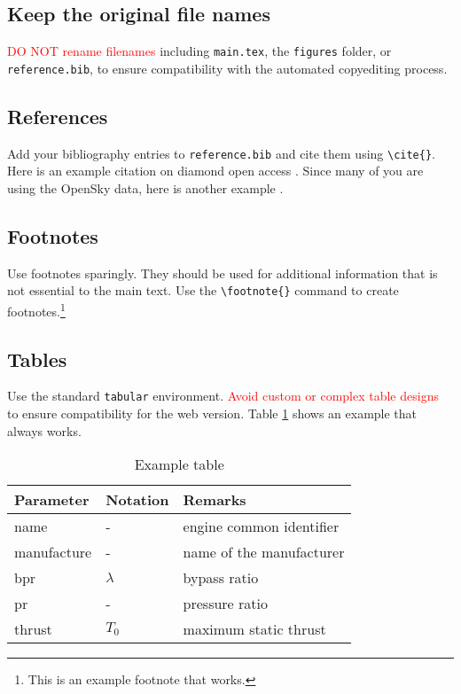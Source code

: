 \subsection{Keep the original file names}
\textcolor{red}{DO NOT rename filenames} including \texttt{main.tex}, the \texttt{figures} folder, or \texttt{reference.bib}, to ensure compatibility with the automated copyediting process.

\subsection{References}
Add your bibliography entries to \texttt{reference.bib} and cite them using \verb|\cite{}|. Here is an example citation on diamond open access \cite{fuchs2013diamond}. Since many of you are using the OpenSky data, here is another example \cite{schafer2014bringing}.

\subsection{Footnotes}
Use footnotes sparingly. They should be used for additional information that is not essential to the main text. Use the \verb|\footnote{}| command to create footnotes.\footnote{This is an example footnote that works.}

\subsection{Tables}
Use the standard \texttt{tabular} environment. \textcolor{red}{Avoid custom or complex table designs} to ensure compatibility for the web version. Table \ref{tb:example_table} shows an example that always works.

\begin{table}[htbp!]
  \centering
  \small
  \caption{Example table}
  \label{tb:example_table}
  \begin{tabular}{lll}
  \toprule
  \textbf{Parameter} & \textbf{Notation} & \textbf{Remarks} \\
  \midrule
  name & - & engine common identifier \\
  manufacture & - & name of the manufacturer  \\
  bpr & $\lambda$ & bypass ratio \\
  pr & - & pressure ratio \\
  thrust & $T_0$ & maximum static thrust\\
  \bottomrule
  \end{tabular}
\end{table}

